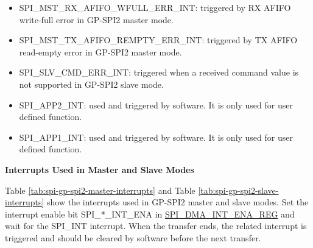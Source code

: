 \documentclass[main\_\_EN.tex]{subfiles}
\begin{document}
\begin{itemize}
\item \label{int:SPIMSTRXAFIFOWFULLERRINT}
SPI\_MST\_RX\_AFIFO\_WFULL\_ERR\_INT: triggered by RX AFIFO write-full error in GP-SPI2 master mode.

\item \label{int:SPIMSTTXAFIFOREMPTYERRINT}
SPI\_MST\_TX\_AFIFO\_REMPTY\_ERR\_INT: triggered by TX AFIFO read-empty error in GP-SPI2 master mode.

\item \label{int:SPISLVCMDERRINT} SPI\_SLV\_CMD\_ERR\_INT: triggered when a received command value is not supported in GP-SPI2 slave mode.

\item \label{int:SPIAPP2INT}SPI\_APP2\_INT: used and triggered by software. It is only used for user defined function.
\item \label{int:SPIAPP1INT}SPI\_APP1\_INT: used and triggered by software. It is only used for user defined function.

\end{itemize}

\textbf{Interrupts Used in Master and Slave Modes}

Table \ref{tab:spi-gp-spi2-master-interrupts} and Table \ref{tab:spi-gp-spi2-slave-interrupts} show the interrupts used in GP-SPI2 master and slave modes. Set the interrupt enable bit SPI\_*\_INT\_ENA in \hyperref[regdesc:SPIDMAINTENAREG]{SPI\_DMA\_INT\_ENA\_REG} and wait for the SPI\_INT interrupt. When the transfer ends, the related interrupt is triggered and should be cleared by software before the next transfer.
\end{document}
